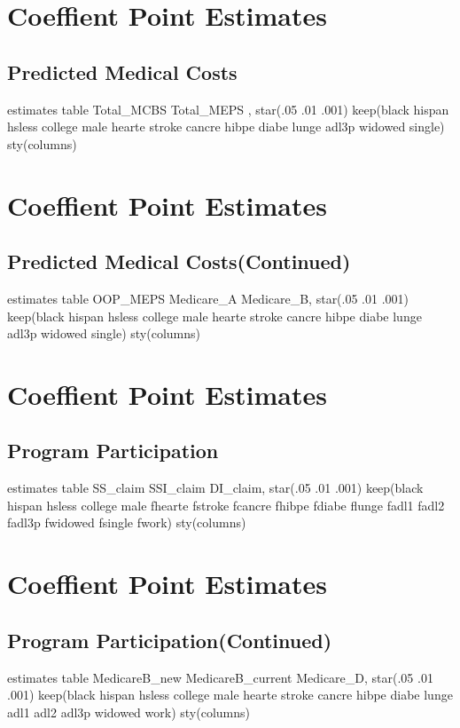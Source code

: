\documentclass{article}
\begin{document}
\pagebreak
\section*{\centering Coeffient Point Estimates}
\subsection*{\centering Predicted Medical Costs}
\begin{Statacode} 
estimates table Total_MCBS Total_MEPS , star(.05 .01 .001) keep(black hispan hsless college male hearte stroke cancre hibpe diabe lunge adl3p widowed single) sty(columns)
\end{Statacode}

\pagebreak
\section*{\centering Coeffient Point Estimates}
\subsection*{\centering Predicted Medical Costs(Continued)}
\begin{Statacode} 
estimates table OOP_MEPS Medicare_A Medicare_B, star(.05 .01 .001) keep(black hispan hsless college male hearte stroke cancre hibpe diabe lunge adl3p widowed single) sty(columns)
\end{Statacode}

\pagebreak
\section*{\centering Coeffient Point Estimates}
\subsection*{\centering Program Participation}
\begin{Statacode}
estimates table SS_claim SSI_claim DI_claim, star(.05 .01 .001) keep(black hispan hsless college male fhearte fstroke fcancre fhibpe fdiabe flunge fadl1 fadl2 fadl3p fwidowed fsingle fwork) sty(columns)
\end{Statacode}

\pagebreak
\section*{\centering Coeffient Point Estimates}
\subsection*{\centering Program Participation(Continued)}
\begin{Statacode}
estimates table MedicareB_new MedicareB_current Medicare_D, star(.05 .01 .001) keep(black hispan hsless college male hearte stroke cancre hibpe diabe lunge adl1 adl2 adl3p widowed work) sty(columns)
\end{Statacode}
\end{document}
